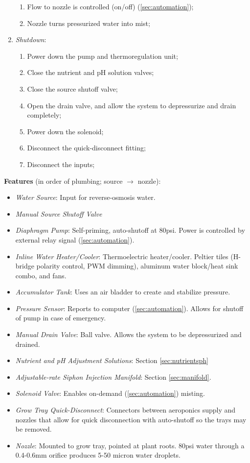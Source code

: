 \documentclass{report}
\begin{document}
\begin{enumerate}
\begin{enumerate}
        \item Flow to nozzle is controlled (on/off) (\ref{sec:automation});
        \item Nozzle turns pressurized water into mist;
    \end{enumerate}
\newpage
    \item \textit{Shutdown}:
    \begin{enumerate}
        \item Power down the pump and thermoregulation unit;
        \item Close the nutrient and pH solution valves;
        \item Close the source shutoff valve;
        \item Open the drain valve, and allow the system to depressurize and  drain completely;
        \item Power down the solenoid;
        \item Disconnect the quick-disconnect fitting;
        \item Disconnect the inputs;
    \end{enumerate}
\end{enumerate}

\textbf{Features} (in order of plumbing; source $\to$ nozzle):
\begin{itemize}
    \item \textit{Water Source}: Input for reverse-osmosis water.
    \item \textit{Manual Source Shutoff Valve}
    \item \textit{Diaphragm Pump}: Self-priming, auto-shutoff at 80psi. Power is controlled by external relay signal (\ref{sec:automation}).
    \item \textit{Inline Water Heater/Cooler}: Thermoelectric heater/cooler. Peltier tiles (H-bridge polarity control, PWM dimming), aluminum water block/heat sink combo, and fans.
    \item \textit{Accumulator Tank}: Uses an air bladder to create and stabilize pressure.
    \item \textit{Pressure Sensor}: Reports to computer (\ref{sec:automation}). Allows for shutoff of pump in case of emergency.
    \item \textit{Manual Drain Valve}: Ball valve. Allows the system to be depressurized and drained.
    \item \textit{Nutrient and pH Adjustment Solutions}: Section \ref{sec:nutrientsph}
    \item \textit{Adjustable-rate Siphon Injection Manifold}: Section \ref{sec:manifold}.
    \item \textit{Solenoid Valve}: Enables on-demand (\ref{sec:automation}) misting.
    \item \textit{Grow Tray Quick-Disconnect}: Connectors between aeroponics supply and nozzles that allow for quick disconnection with auto-shutoff so the trays may be removed.
    \item \textit{Nozzle}: Mounted to grow tray, pointed at plant roots. 80psi water through a 0.4-0.6mm orifice produces 5-50 micron water droplets. %
\end{itemize}
\end{document}
